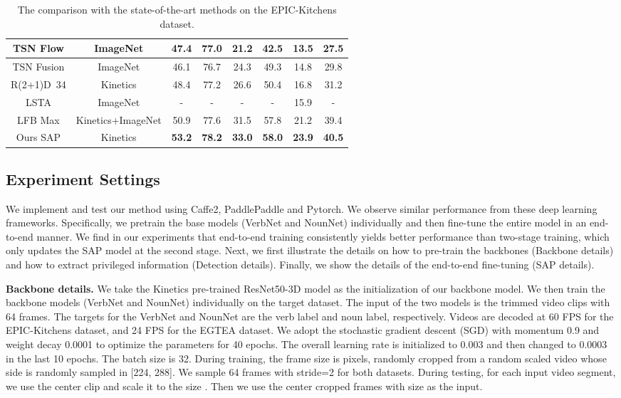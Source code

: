 \documentclass[letterpaper]{article} \usepackage{aaai20}  \usepackage{times}  \usepackage{helvet} \usepackage{courier}  \usepackage[hyphens]{url}  \usepackage{graphicx} \urlstyle{rm} \def\UrlFont{\rm}  \usepackage{graphicx}  \frenchspacing  \setlength{\pdfpagewidth}{8.5in}  \setlength{\pdfpageheight}{11in}  \usepackage{amsfonts,amssymb}
\begin{document}
\begin{table*}[t]
\begin{tabular}{|c|c|c|c|c|c|c|c|}
TSN Flow \cite{price2019evaluation}& ImageNet & 47.4 & 77.0 & 21.2 & 42.5 & 13.5 & 27.5 \\ \hline
TSN Fusion \cite{price2019evaluation} & ImageNet & 46.1 & 76.7 & 24.3 & 49.3 & 14.8 & 29.8 \\ \hline
R(2+1)D~34 \cite{Ghadiyaram_2019_CVPR}& Kinetics & 48.4 & 77.2 & 26.6 & 50.4 & 16.8 & 31.2 \\ \hline
LSTA \cite{Sudhakaran_2019_CVPR}& ImageNet & - & - & - & - & 15.9 & - \\ \hline
LFB Max \cite{Wu2018LongTermFB}& Kinetics+ImageNet & 50.9 & 77.6 & 31.5 & 57.8 & 21.2 & 39.4 \\ \hline
Ours SAP & Kinetics & \textbf{53.2} & \textbf{78.2} & \textbf{33.0} & \textbf{58.0} & \textbf{23.9} & \textbf{40.5} \\ \hline
\end{tabular}
\caption{The comparison with the state-of-the-art methods on the EPIC-Kitchens dataset.}  
\label{tab:epic_sota}
\end{table*}


\subsection{Experiment Settings}
 We implement and test our method using Caffe2, PaddlePaddle and Pytorch. We observe similar performance from these deep learning frameworks. 
Specifically, we pretrain the base models (VerbNet and NounNet) individually and then fine-tune the entire model in an end-to-end manner. We find in our experiments that end-to-end training consistently yields better performance than two-stage training, which only updates the SAP model at the second stage.
Next, we first illustrate the details on how to pre-train the backbones (Backbone details) and how to extract privileged information (Detection details). Finally, we show the details of the end-to-end fine-tuning (SAP details).

\textbf{Backbone details.} We take the Kinetics pre-trained ResNet50-3D model as the initialization of our backbone model.
We then train the backbone models (VerbNet and NounNet) individually on the target dataset.
The input of the two models is the trimmed video clips with 64 frames. The targets for the VerbNet and NounNet are the verb label and noun label, respectively.
Videos are decoded at 60 FPS for the EPIC-Kitchens dataset, and 24 FPS for the EGTEA dataset.
We adopt the stochastic gradient descent (SGD) with momentum 0.9
and weight decay 0.0001 to optimize the parameters for 40
epochs. The overall learning rate is initialized to 0.003 and then changed to 0.0003 in the last 10 epochs. The batch size is 32.
During training, the frame size is  pixels, randomly cropped from a random scaled video whose side is randomly sampled in [224, 288]. We sample 64 frames with stride=2 for both datasets.
During testing, for each input video segment, we use the center clip and scale it to the size . Then we use the center cropped frames with size  as the input.
\end{document}
